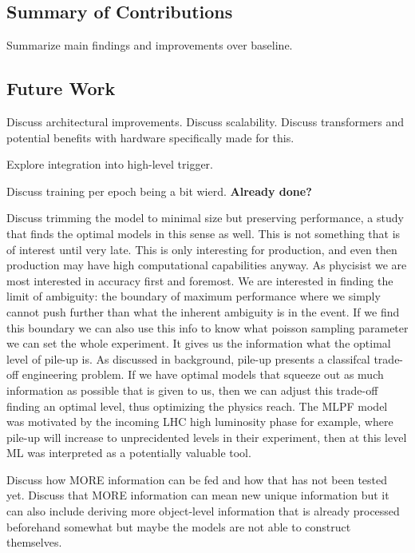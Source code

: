 
\subsection{Summary of Contributions}
Summarize main findings and improvements over baseline.

\subsection{Future Work}
Discuss architectural improvements. Discuss scalability.
Discuss transformers and potential benefits with hardware specifically made for this. 

Explore integration into high-level trigger.

Discuss training per epoch being a bit wierd. \textbf{Already done?}

Discuss trimming the model to minimal size but preserving performance, a study that finds the optimal models in this sense as well. This is not something that is of interest until very late. This is only interesting for production, and even then production may have high computational capabilities anyway. As phycisist we are most interested in accuracy first and foremost. We are interested in finding the limit of ambiguity: the boundary of maximum performance where we simply cannot push further than what the inherent ambiguity is in the event. If we find this boundary we can also use this info to know what poisson sampling parameter we can set the whole experiment. It gives us the information what the optimal level of pile-up is. As discussed in background, pile-up presents a classifcal trade-off engineering problem. If we have optimal models that squeeze out as much information as possible that is given to us, then we can adjust this trade-off finding an optimal level, thus optimizing the physics reach. The MLPF model was motivated by the incoming LHC high luminosity phase for example, where pile-up will increase to unprecidented levels in their experiment, then at this level ML was interpreted as a potentially valuable tool. 

Discuss how MORE information can be fed and how that has not been tested yet. Discuss that MORE information can mean new unique information but it can also include deriving more object-level information that is already processed beforehand somewhat but maybe the models are not able to construct themselves. 

